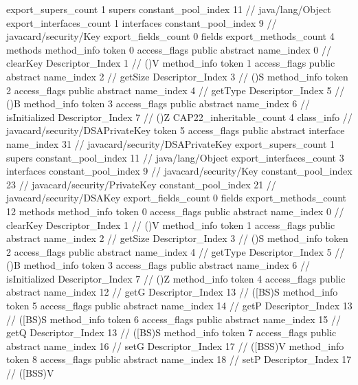 {{{			export_supers_count	1
			supers {
				constant_pool_index	11		// java/lang/Object
			}
			export_interfaces_count	1
			interfaces {
				constant_pool_index	9		// javacard/security/Key
			}
			export_fields_count	0
			fields {
			}
			export_methods_count	4
			methods {
				method_info {
					token	0
					access_flags	public abstract
					name_index	0		// clearKey
					Descriptor_Index	1		// ()V
				}
				method_info {
					token	1
					access_flags	public abstract
					name_index	2		// getSize
					Descriptor_Index	3		// ()S
				}
				method_info {
					token	2
					access_flags	public abstract
					name_index	4		// getType
					Descriptor_Index	5		// ()B
				}
				method_info {
					token	3
					access_flags	public abstract
					name_index	6		// isInitialized
					Descriptor_Index	7		// ()Z
				}
			}
			CAP22_inheritable_count	4
		}
		class_info {		// javacard/security/DSAPrivateKey
			token	5
			access_flags	public abstract interface
			name_index	31		// javacard/security/DSAPrivateKey
			export_supers_count	1
			supers {
				constant_pool_index	11		// java/lang/Object
			}
			export_interfaces_count	3
			interfaces {
				constant_pool_index	9		// javacard/security/Key
				constant_pool_index	23		// javacard/security/PrivateKey
				constant_pool_index	21		// javacard/security/DSAKey
			}
			export_fields_count	0
			fields {
			}
			export_methods_count	12
			methods {
				method_info {
					token	0
					access_flags	public abstract
					name_index	0		// clearKey
					Descriptor_Index	1		// ()V
				}
				method_info {
					token	1
					access_flags	public abstract
					name_index	2		// getSize
					Descriptor_Index	3		// ()S
				}
				method_info {
					token	2
					access_flags	public abstract
					name_index	4		// getType
					Descriptor_Index	5		// ()B
				}
				method_info {
					token	3
					access_flags	public abstract
					name_index	6		// isInitialized
					Descriptor_Index	7		// ()Z
				}
				method_info {
					token	4
					access_flags	public abstract
					name_index	12		// getG
					Descriptor_Index	13		// ([BS)S
				}
				method_info {
					token	5
					access_flags	public abstract
					name_index	14		// getP
					Descriptor_Index	13		// ([BS)S
				}
				method_info {
					token	6
					access_flags	public abstract
					name_index	15		// getQ
					Descriptor_Index	13		// ([BS)S
				}
				method_info {
					token	7
					access_flags	public abstract
					name_index	16		// setG
					Descriptor_Index	17		// ([BSS)V
				}
				method_info {
					token	8
					access_flags	public abstract
					name_index	18		// setP
					Descriptor_Index	17		// ([BSS)V
}}}}}
